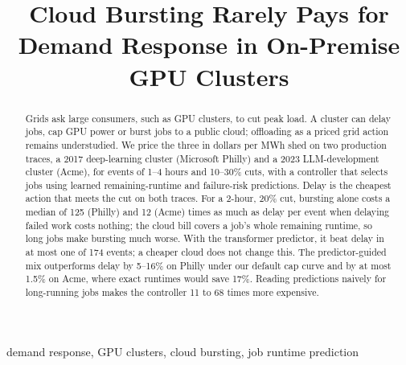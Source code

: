 \documentclass[conference]{IEEEtran}
\begin{document}
\title{Cloud Bursting Rarely Pays for Demand Response in On-Premise GPU Clusters}
\author{}
\maketitle

\begin{abstract}
Grids ask large consumers, such as GPU clusters, to cut peak load. A cluster can delay jobs, cap GPU power or burst jobs to a public cloud; offloading as a priced grid action remains understudied. We price the three in dollars per MWh shed on two production traces, a 2017 deep-learning cluster (Microsoft Philly) and a 2023 LLM-development cluster (Acme), for events of 1--4 hours and 10--30\% cuts, with a controller that selects jobs using learned remaining-runtime and failure-risk predictions. Delay is the cheapest action that meets the cut on both traces. For a 2-hour, 20\% cut, bursting alone costs a median of 125 (Philly) and 12 (Acme) times as much as delay per event when delaying failed work costs nothing; the cloud bill covers a job's whole remaining runtime, so long jobs make bursting much worse. With the transformer predictor, it beat delay in at most one of 174 events; a cheaper cloud does not change this. The predictor-guided mix outperforms delay by 5--16\% on Philly under our default cap curve and by at most 1.5\% on Acme, where exact runtimes would save 17\%. Reading predictions naively for long-running jobs makes the controller 11 to 68 times more expensive.
\end{abstract}

\begin{IEEEkeywords}
demand response, GPU clusters, cloud bursting, job runtime prediction
\end{IEEEkeywords}










\end{document}
